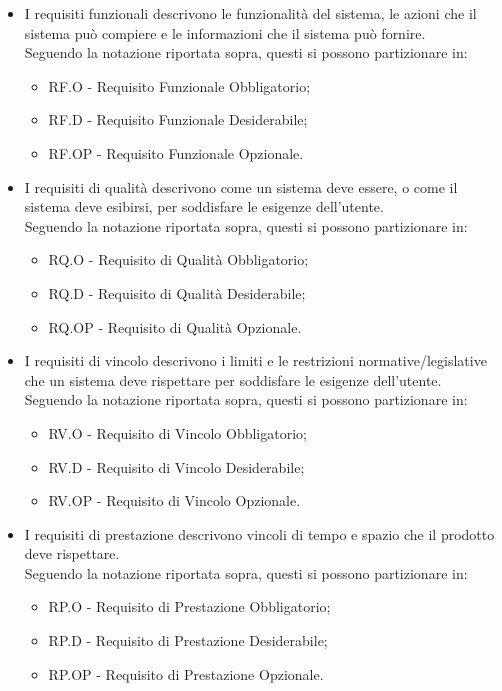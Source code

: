 \documentclass[10pt, a4paper]{article}
\begin{document}
\begin{itemize}
\item I requisiti funzionali descrivono le funzionalità del sistema, le azioni
che il sistema può compiere e le informazioni che il sistema può fornire.\\
Seguendo la notazione riportata sopra, questi si possono partizionare in:
\begin{itemize}
    \item RF.O - Requisito Funzionale Obbligatorio;
    \item RF.D - Requisito Funzionale Desiderabile;
    \item RF.OP - Requisito Funzionale Opzionale.
\end{itemize}
\end{itemize}
\begin{itemize}
\item I requisiti di qualità descrivono come un sistema deve essere, o
come il sistema deve esibirsi, per soddisfare le esigenze dell'utente.\\
Seguendo la notazione riportata sopra, questi si possono partizionare in:
\begin{itemize}
    \item RQ.O - Requisito di Qualità Obbligatorio;
    \item RQ.D - Requisito di Qualità Desiderabile;
    \item RQ.OP - Requisito di Qualità Opzionale.
\end{itemize}
\end{itemize}
\begin{itemize}
\item I requisiti di vincolo descrivono i limiti e le restrizioni normative/legislative che un sistema deve rispettare per soddisfare le esigenze dell'utente.\\
Seguendo la notazione riportata sopra, questi si possono partizionare in:
\begin{itemize}
    \item RV.O - Requisito di Vincolo Obbligatorio;
    \item RV.D - Requisito di Vincolo Desiderabile;
    \item RV.OP - Requisito di Vincolo Opzionale. 
\end{itemize}
\item I requisiti di prestazione descrivono vincoli di tempo e spazio che il prodotto deve rispettare.\\
Seguendo la notazione riportata sopra, questi si possono partizionare in:
\begin{itemize}
    \item RP.O - Requisito di Prestazione Obbligatorio;
    \item RP.D - Requisito di Prestazione Desiderabile;
    \item RP.OP - Requisito di Prestazione Opzionale. 
\end{itemize}
\end{itemize}
\end{document}
